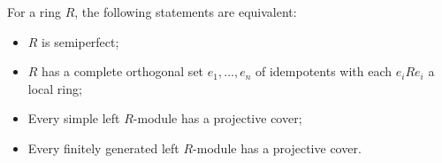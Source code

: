 For a ring $R$, the following statements are equivalent:
\begin{itemize}
\item[(a)] $R$ is semiperfect;
\item[(b)] $R$ has a complete orthogonal set $e_1, \ldots, e_n$ of idempotents with each $e_i R e_i$ a local ring;
\item[(c)] Every simple left $R$-module has a projective cover;
\item[(d)] Every finitely generated left $R$-module has a projective cover.
\end{itemize}
